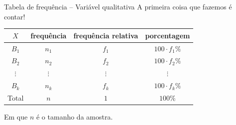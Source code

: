 \documentclass[
  10pt,
  ignorenonframetext,
]{beamer}
\begin{document}
\begin{frame}{Tabela de frequência -- Variável qualitativa}
\protect\hypertarget{tabela-de-frequuxeancia-variuxe1vel-qualitativa}{}
A primeira coisa que fazemos é contar!

\begin{longtable}[]{@{}cccc@{}}
\toprule
\(X\) & frequência & frequência relativa & porcentagem\tabularnewline
\midrule
\endhead
\(B_1\) & \(n_1\) & \(f_1\) & \(100 \cdot f_1\%\)\tabularnewline
\(B_2\) & \(n_2\) & \(f_2\) & \(100 \cdot f_2\%\)\tabularnewline
\(\vdots\) & \(\vdots\) & \(\vdots\) & \(\vdots\)\tabularnewline
\(B_k\) & \(n_k\) & \(f_k\) & \(100 \cdot f_k\%\)\tabularnewline
Total & \(n\) & \(1\) & \(100\%\)\tabularnewline
\bottomrule
\end{longtable}

Em que \(n\) é o tamanho da amostra.
\end{frame}
\end{document}

